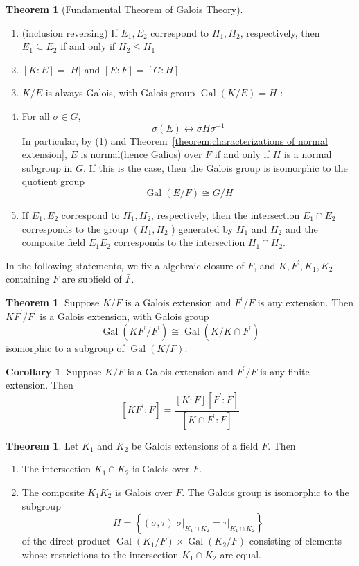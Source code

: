 \documentclass[a4paper,12pt]{article}
\newcommand{\p}{^{\prime}}
\theoremstyle{definition}
\newtheorem{coro}[defn]{Corollary}
\newtheorem{theo}[defn]{Theorem}
\begin{document}
\begin{theo}[Fundamental Theorem of Galois Theory]
\begin{enumerate}[(1)]
        \item (inclusion reversing) If $E_1, E_2$ correspond to $H_1, H_2$, respectively, then $E_1 \subseteq E_2$ if and only if $H_2 \leq H_1$
        \item $[K: E]=|H|$ and $[E: F]=[G: H]$
        \item $K / E$ is always Galois, with Galois group $\operatorname{Gal}(K / E)=H$ :
        \item For all $\sigma\in G$,$$\sigma(E)\longleftrightarrow \sigma H\sigma^{-1}$$
              In particular, by (1) and Theorem~\ref{theorem:characterizations of normal extension}, $E$ is normal(hence Galios) over $F$ if and only if $H$ is a normal subgroup in $G$. If this is the case, then the Galois group is isomorphic to the quotient group
              $$
                  \operatorname{Gal}(E / F) \cong G / H
              $$
        \item If $E_1, E_2$ correspond to $H_1, H_2$, respectively, then the intersection $E_1 \cap E_2$ corresponds to the group $\left(H_1, H_2\right.$ ) generated by $H_1$ and $H_2$ and the composite field $E_1 E_2$ corresponds to the intersection $H_1 \cap H_2$.
    \end{enumerate}

\end{theo}
In the following statements, we fix a algebraic closure of $F$, and $K,F\p,K_1,K_2$ containing $F$ are subfield of $\bar{F}$.
\begin{theo}
    Suppose $K/F$ is a Galois extension and $F^{\prime} / F$ is any extension. Then $K F^{\prime} / F^{\prime}$ is a Galois extension, with Galois group
    $$
        \operatorname{Gal}\left(K F^{\prime} / F^{\prime}\right) \cong \operatorname{Gal}\left(K / K \cap F^{\prime}\right)
    $$
    isomorphic to a subgroup of $\operatorname{Gal}(K / F)$.
\end{theo}
\begin{coro}
    Suppose $K / F$ is a Galois extension and $F^{\prime} / F$ is any finite extension. Then
    $$
        \left[K F^{\prime}: F\right]=\frac{[K: F]\left[F^{\prime}: F\right]}{\left[K \cap F^{\prime}: F\right]}
    $$
\end{coro}
\begin{theo}
    Let $K_1$ and $K_2$ be Galois extensions of a field $F$. Then
    \begin{enumerate}[(1)]
        \item The intersection $K_1 \cap K_2$ is Galois over $F$.
        \item The composite $K_1 K_2$ is Galois over $F$. The Galois group is isomorphic to the subgroup
              $$
                  H=\left\{(\sigma, \tau)|\sigma|_{K_1 \cap K_2}=\left.\tau\right|_{K_1 \cap K_2}\right\}
              $$
              of the direct product $\operatorname{Gal}\left(K_1 / F\right) \times \operatorname{Gal}\left(K_2 / F\right)$ consisting of elements whose restrictions to the intersection $K_1 \cap K_2$ are equal.
    \end{enumerate}
\end{theo}
\end{document}
